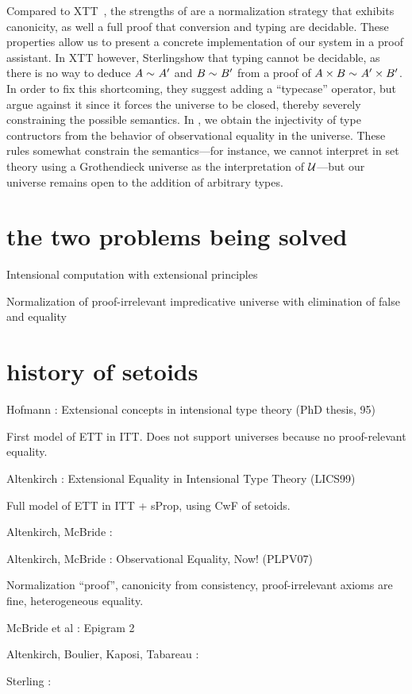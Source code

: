 Compared to XTT~, the strengths of \SetoidTT are a
normalization strategy that exhibits canonicity, as well a full proof that conversion and typing
are decidable. These properties allow us to present a concrete implementation of our system
in a proof assistant.
%
In XTT however, Sterling\etal show that typing cannot be decidable, as there is no way to deduce
\( A \sim_{} A' \) and \( B \sim_{} B' \) from a proof of \( A \times B \sim_{} A' \times B' \).
%
In order to fix this shortcoming, they suggest adding a ``typecase'' operator, but
argue against it since it forces the universe to be closed, thereby severely constraining the
possible semantics.
%
In \SetoidTT, we obtain the injectivity of type contructors from the behavior of observational
equality in the universe. These rules somewhat constrain the semantics---for instance, we cannot
interpret \SetoidTT in set theory using a Grothendieck universe as the interpretation of \( \mathcal{U} \)---but our universe remains open to the addition of arbitrary types.


\section{the two problems being solved}

Intensional computation with extensional principles

Normalization of proof-irrelevant impredicative universe with elimination of false and equality

\section{history of setoids}

Hofmann : Extensional concepts in intensional type theory (PhD thesis, 95)

First model of ETT in ITT. Does not support universes because no proof-relevant equality.

Altenkirch : Extensional Equality in Intensional Type Theory (LICS99)

Full model of ETT in ITT + sProp, using CwF of setoids.

Altenkirch, McBride : 

Altenkirch, McBride : Observational Equality, Now! (PLPV07)

Normalization ``proof'', canonicity from consistency, proof-irrelevant axioms 
are fine, heterogeneous equality.

McBride et al : Epigram 2

Altenkirch, Boulier, Kaposi, Tabareau :

Sterling :
